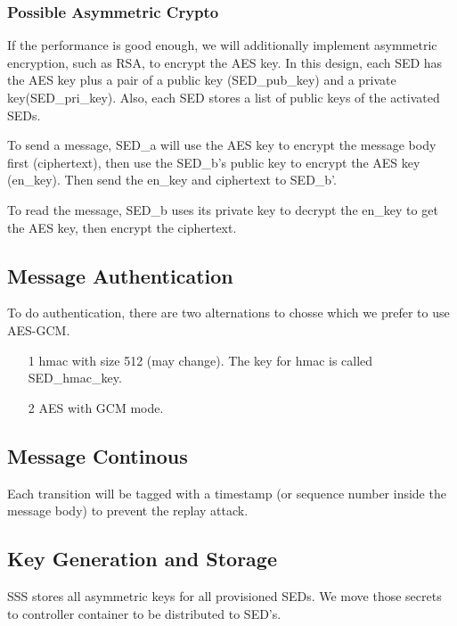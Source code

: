 \documentclass[11pt,oneside,onecolumn,letterpaper]{article}
\begin{document}
\subsubsection{Possible Asymmetric Crypto}
If the performance is good enough, we will additionally implement asymmetric encryption, such as RSA, to encrypt the AES key.
In this design, each SED has the AES key plus a pair of a public key (SED\_pub\_key) and a private key(SED\_pri\_key).
Also, each SED stores a list of public keys of the activated SEDs.

To send a message, SED\_a will use the AES key to encrypt the message body first (ciphertext), then use the SED\_b's public key to encrypt the AES key (en\_key).
Then send the en\_key and ciphertext to SED\_b'.

To read the message, SED\_b uses its private key to decrypt the en\_key to get the AES key, then encrypt the ciphertext. 

\subsection{Message Authentication}
To do authentication, there are two alternations to chosse which we prefer to use AES-GCM.
\begin{itemize}
  \item[1] hmac with size 512 (may change).
  The key for hmac is called SED\_hmac\_key.
  \item[2] AES with GCM mode.
\end{itemize}

\subsection{Message Continous}
Each transition will be tagged with a timestamp (or sequence number inside the message body) to prevent the replay attack.

\subsection{Key Generation and Storage}
SSS stores all asymmetric keys for all provisioned SEDs. We move those secrets to controller container to be distributed to SED's.

\end{document}
